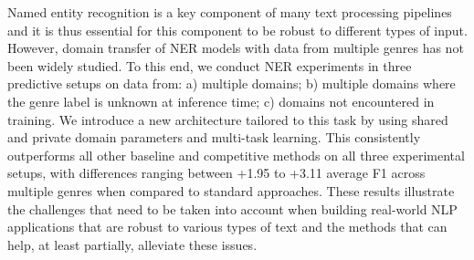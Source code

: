 Named entity recognition is a key component of many text processing pipelines and it is thus essential for this component to be robust to different types of input.  However, domain transfer of NER models with data from multiple genres has not been widely studied.  To this end, we conduct NER experiments in three predictive setups on data from: a) multiple domains; b) multiple domains where the genre label is unknown at inference time; c) domains not encountered in training.  We introduce a new architecture tailored to this task by using shared and private domain parameters and multi-task learning. This consistently outperforms all other baseline and competitive methods on all three experimental setups, with differences ranging between +1.95 to +3.11 average F1 across multiple genres when compared to standard approaches.  These results illustrate the challenges that need to be taken into account when building real-world NLP applications that are robust to various types of text and the methods that can help, at least partially, alleviate these issues.
